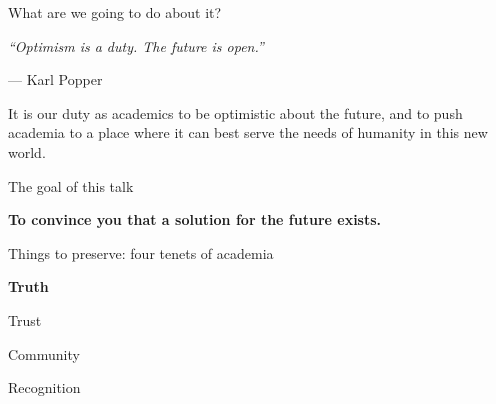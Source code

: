 \documentclass[aspectratio=169,10pt]{beamer}
\newcommand{\jtmeta}{\footnotesize}
\begin{document}
\begin{frame}{What are we going to do about it?}
  \vfill
  {\fontsize{15}{21}\selectfont\itshape\color{jtslate}%
    ``Optimism is a duty. The future is open.''\par}
  \vspace{2pt}
  {\jtmeta\color{jtgrey}--- Karl Popper\par}
  \vspace{18pt}
  \begin{minipage}{0.94\textwidth}
    \raggedright
    {\color{jtslate}\fontsize{17}{24}\selectfont
      It is our duty as academics to be optimistic about the future, and to
      push academia to a place where it can best serve the needs of humanity
      in this new world.\par}
  \end{minipage}
  \vfill
\end{frame}

\begin{frame}{The goal of this talk}
  \vfill
  \begin{minipage}{0.94\textwidth}
    \raggedright
    {\color{jtslate}\fontsize{22}{30}\selectfont\bfseries
      To convince you that a solution for the future exists.\par}
  \end{minipage}
  \vfill
\end{frame}

\begin{frame}{Things to preserve: four tenets of academia}
  \vfill
  \begin{minipage}{0.94\textwidth}
    \raggedright
    {\color{jtslate}\fontsize{26}{36}\selectfont\bfseries
      Truth\par Trust\par Community\par Recognition\par}
  \end{minipage}
  \vfill
\end{frame}
\end{document}
